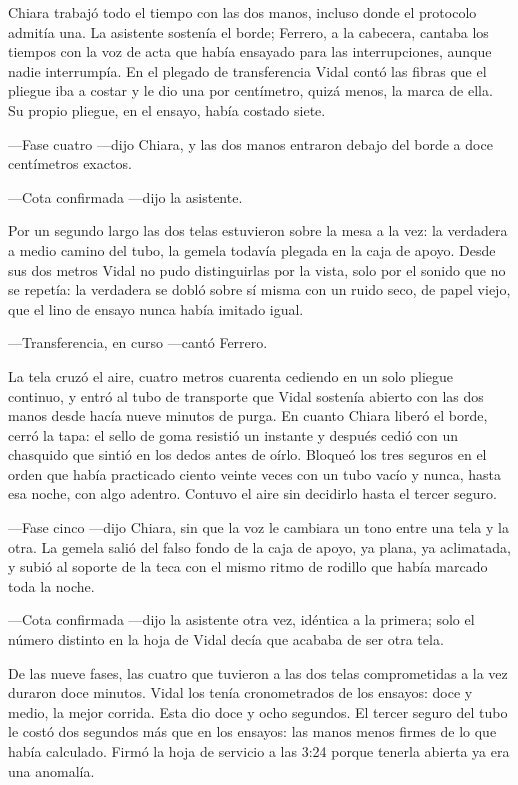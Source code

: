 Chiara trabajó todo el tiempo con las dos manos, incluso donde el protocolo admitía una. La asistente sostenía el borde; Ferrero, a la cabecera, cantaba los tiempos con la voz de acta que había ensayado para las interrupciones, aunque nadie interrumpía. En el plegado de transferencia Vidal contó las fibras que el pliegue iba a costar y le dio una por centímetro, quizá menos, la marca de ella. Su propio pliegue, en el ensayo, había costado siete.

---Fase cuatro ---dijo Chiara, y las dos manos entraron debajo del borde a doce centímetros exactos.

---Cota confirmada ---dijo la asistente.

Por un segundo largo las dos telas estuvieron sobre la mesa a la vez: la verdadera a medio camino del tubo, la gemela todavía plegada en la caja de apoyo. Desde sus dos metros Vidal no pudo distinguirlas por la vista, solo por el sonido que no se repetía: la verdadera se dobló sobre sí misma con un ruido seco, de papel viejo, que el lino de ensayo nunca había imitado igual.

---Transferencia, en curso ---cantó Ferrero.

La tela cruzó el aire, cuatro metros cuarenta cediendo en un solo pliegue continuo, y entró al tubo de transporte que Vidal sostenía abierto con las dos manos desde hacía nueve minutos de purga. En cuanto Chiara liberó el borde, cerró la tapa: el sello de goma resistió un instante y después cedió con un chasquido que sintió en los dedos antes de oírlo. Bloqueó los tres seguros en el orden que había practicado ciento veinte veces con un tubo vacío y nunca, hasta esa noche, con algo adentro. Contuvo el aire sin decidirlo hasta el tercer seguro.

---Fase cinco ---dijo Chiara, sin que la voz le cambiara un tono entre una tela y la otra. La gemela salió del falso fondo de la caja de apoyo, ya plana, ya aclimatada, y subió al soporte de la teca con el mismo ritmo de rodillo que había marcado toda la noche.

---Cota confirmada ---dijo la asistente otra vez, idéntica a la primera; solo el número distinto en la hoja de Vidal decía que acababa de ser otra tela.

De las nueve fases, las cuatro que tuvieron a las dos telas comprometidas a la vez duraron doce minutos. Vidal los tenía cronometrados de los ensayos: doce y medio, la mejor corrida. Esta dio doce y ocho segundos. El tercer seguro del tubo le costó dos segundos más que en los ensayos: las manos menos firmes de lo que había calculado. Firmó la hoja de servicio a las 3:24 porque tenerla abierta ya era una anomalía.

